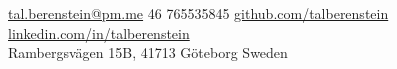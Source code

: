 \documentclass[10pt,a4paper]{article}
\begin{document}
\sloppy  %



\nobreakvspace{0.3em}  %

\noindent\href{mailto:tal.berenstein@pm.me}{tal.berenstein\mbox{}@\mbox{}pm.me}\sbull
\textsmaller{+}46 765535845\sbull
\href{https://github.com/talberenstein}{github.com/talberenstein}\sbull
\href{http://linkedin.com/in/tal-berenstein}{linkedin.com/in/talberenstein}
\\
Rambergsvägen 15B,
41713\thinspace {\large \sc }\sbull
Göteborg\sbull
Sweden

\spacedhrule{0.9em}{-0.4em}  %

\end{document}

